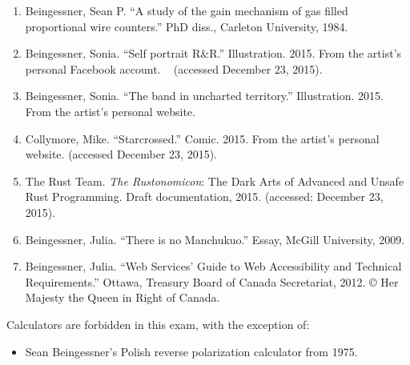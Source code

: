 \documentclass[11pt]{exam}
\begin{document}
\begin{enumerate}
\item Beingessner, Sean P. ``A study of the gain mechanism of gas filled proportional wire counters.'' PhD diss., Carleton University, 1984.

\item Beingessner, Sonia. ``Self portrait R\&R.'' Illustration. 2015. From the artist’s personal Facebook account. \
(accessed December 23, 2015).

\item Beingessner, Sonia. ``The band in uncharted territory.'' Illustration. 2015. From the artist’s personal website.

\item Collymore, Mike. ``Starcrossed.'' Comic. 2015. From the artist’s personal website.
(accessed December 23, 2015).

\item The Rust Team. \emph{The Rustonomicon}: The Dark Arts of Advanced and Unsafe Rust Programming. Draft documentation, 2015.
(accessed: December 23, 2015).

\item Beingessner, Julia. ``There is no Manchukuo.'' Essay, McGill University, 2009.

\item Beingessner, Julia. ``Web Services' Guide to Web Accessibility and Technical Requirements.''
Ottawa, Treasury Board of Canada Secretariat, 2012. © Her Majesty the Queen in Right of
Canada.
\end{enumerate}

Calculators are forbidden in this exam, with the exception of:

\begin{itemize}
\item Sean Beingessner's Polish reverse polarization calculator from 1975.
\end{itemize}




\newpage %

%
%
%
\end{document}

